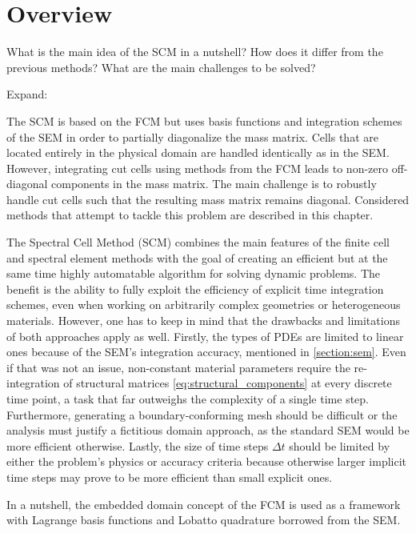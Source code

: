 %
\section{Overview}
\label{section:overview}
%

What is the main idea of the SCM in a nutshell?
How does it differ from the previous methods?
What are the main challenges to be solved?

Expand:

The SCM is based on the FCM but uses basis functions and integration schemes
of the SEM in order to partially diagonalize the mass matrix. Cells that are
located entirely in the physical domain are handled identically as in the SEM.
However, integrating cut cells using methods from the FCM leads to non-zero
off-diagonal components in the mass matrix. The main challenge is to
robustly handle cut cells such that the resulting mass matrix remains diagonal.
Considered methods that attempt to tackle this problem are described in this
chapter.

The Spectral Cell Method (SCM) combines the main features of the finite cell and spectral element methods with the goal of creating an efficient but at the same time highly automatable algorithm for solving dynamic problems. The benefit is the ability to fully exploit the efficiency of explicit time integration schemes, even when working on arbitrarily complex geometries or heterogeneous materials. However, one has to keep in mind that the drawbacks and limitations of both approaches apply as well. Firstly, the types of PDEs are limited to linear ones because of the SEM's integration accuracy, mentioned in \ref{section:sem}. Even if that was not an issue, non-constant material parameters require the re-integration of structural matrices \ref{eq:structural_components} at every discrete time point, a task that far outweighs the complexity of a single time step. Furthermore, generating a boundary-conforming mesh should be difficult or the analysis must justify a fictitious domain approach, as the standard SEM would be more efficient otherwise. Lastly, the size of time steps $\Delta t$ should be limited by either the problem's physics or accuracy criteria because otherwise larger implicit time steps may prove to be more efficient than small explicit ones.

In a nutshell, the embedded domain concept of the FCM is used as a framework with Lagrange basis functions and Lobatto quadrature borrowed from the SEM. 